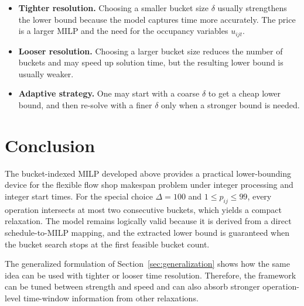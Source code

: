 \documentclass[11pt]{article}
\begin{document}
\begin{itemize}[leftmargin=1.5em]
    \item \textbf{Tighter resolution.} Choosing a smaller bucket size $\delta$ usually strengthens the lower bound because the model captures time more accurately. The price is a larger MILP and the need for the occupancy variables $u_{ijt}$.
    \item \textbf{Looser resolution.} Choosing a larger bucket size reduces the number of buckets and may speed up solution time, but the resulting lower bound is usually weaker.
    \item \textbf{Adaptive strategy.} One may start with a coarse $\delta$ to get a cheap lower bound, and then re-solve with a finer $\delta$ only when a stronger bound is needed.
\end{itemize}


\section{Conclusion}

The bucket-indexed MILP developed above provides a practical lower-bounding device for the flexible flow shop makespan problem under integer processing and integer start times.
For the special choice $\Delta=100$ and $1\le p_{ij}\le 99$, every operation intersects at most two consecutive buckets, which yields a compact relaxation.
The model remains logically valid because it is derived from a direct schedule-to-MILP mapping, and the extracted lower bound is guaranteed when the bucket search stops at the first feasible bucket count.

The generalized formulation of Section~\ref{sec:generalization} shows how the same idea can be used with tighter or looser time resolution.
Therefore, the framework can be tuned between strength and speed and can also absorb stronger operation-level time-window information from other relaxations.
\end{document}
